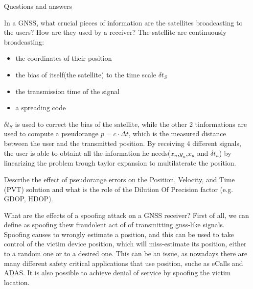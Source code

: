   \begin{section}{Questions and answers}
    \begin{subsubsection}{In a GNSS, what crucial pieces of information are the satellites
      broadcasting to the users? How are they used by a receiver?}
      The satellite are continuously broadcasting:
      \begin{itemize}
        \item the coordinates of their position
        \item the bias of itself(the satellite) to the time scale $\delta t_S$
        \item the transmission time of the signal
        \item a spreading code
      \end{itemize}
      $\delta t_S$ is used to correct the bias of the satellite, while the other 2 tinformations are
      used to compute a pseudorange $p=c\cdot \Delta t$, which is the measured distance between the
      user and the transmitted position. By receiving 4 different signals, the user is able to
      obtaint all the information he needs($x_u$,$y_u$,$x_u$ and $\delta t_u$) by linearizing the
      problem trough taylor expansion to multilaterate the position.
    \end{subsubsection}

    \begin{subsubsection}{Describe the effect of pseudorange errors on the Position, Velocity, and
        Time (PVT) solution and what is the role of the Dilution Of Precision factor (e.g. GDOP,
      HDOP).}
    \end{subsubsection}

    \begin{subsubsection}{What are the effects of a spoofing attack on a GNSS receiver?}
      First of all, we can define as spoofing thew fraudolent act of of transmitting gnss-like
      signals. Spoofing causes to wrongly estimate a position, and this can be used to take control
      of the victim device position, which will miss-estimate its position, either to a random one
      or to a desired one. This can be an issue, as nowadays there are many different safety
      critical applications that use position, suche as eCalls and ADAS. It is also possible to
      achieve denial of service by spoofing the victim location.
    \end{subsubsection}

  \end{section}


